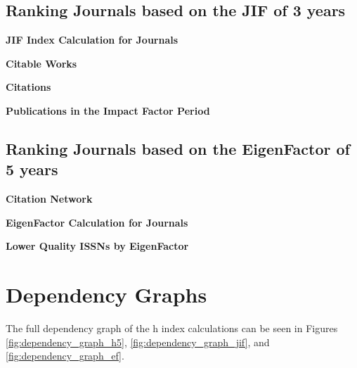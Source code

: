 \subsection{Ranking Journals based on the JIF of 3 years}

\textbf{JIF Index Calculation for Journals}





\textbf{Citable Works}





\textbf{Citations}





\textbf{Publications in the Impact Factor Period}



\subsection{Ranking Journals based on the EigenFactor of 5 years}

\textbf{Citation Network}



\textbf{EigenFactor Calculation for Journals}



\textbf{Lower Quality ISSNs by EigenFactor}



\section{Dependency Graphs}
The full dependency graph of the h index calculations can be seen in Figures
\ref{fig:dependency_graph_h5}, \ref{fig:dependency_graph_jif}, and
\ref{fig:dependency_graph_ef}.


